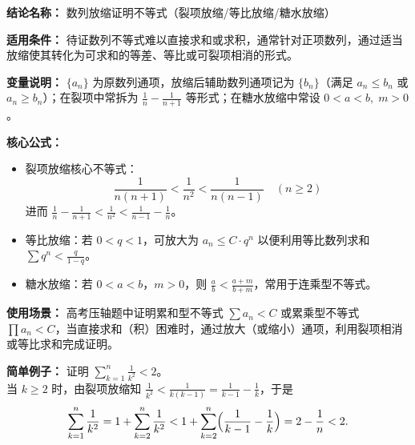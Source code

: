 \textbf{结论名称：} 数列放缩证明不等式（裂项放缩/等比放缩/糖水放缩）

\textbf{适用条件：} 待证数列不等式难以直接求和或求积，通常针对正项数列，通过适当放缩使其转化为可求和的等差、等比或可裂项相消的形式。

\textbf{变量说明：} $\{a_n\}$ 为原数列通项，放缩后辅助数列通项记为 $\{b_n\}$（满足 $a_n\le b_n$ 或 $a_n\ge b_n$）；在裂项中常拆为 $\frac{1}{n}-\frac{1}{n+1}$ 等形式；在糖水放缩中常设 $0<a<b,\;m>0$。

\textbf{核心公式：}
\begin{itemize}
  \item 裂项放缩核心不等式：
  \[
  \boxed{\frac{1}{n(n+1)} < \frac{1}{n^2} < \frac{1}{n(n-1)}\quad (n\ge 2)}
  \]
  进而 $\frac{1}{n}-\frac{1}{n+1} < \frac{1}{n^2} < \frac{1}{n-1}-\frac{1}{n}$。
  \item 等比放缩：若 $0<q<1$，可放大为 $a_n\le C\cdot q^n$ 以便利用等比数列求和 $\sum q^n < \frac{q}{1-q}$。
  \item 糖水放缩：若 $0<a<b$，$m>0$，则 $\frac{a}{b} < \frac{a+m}{b+m}$，常用于连乘型不等式。
\end{itemize}

\textbf{使用场景：} 高考压轴题中证明累和型不等式 $\sum a_n < C$ 或累乘型不等式 $\prod a_n < C$，当直接求和（积）困难时，通过放大（或缩小）通项，利用裂项相消或等比求和完成证明。

\textbf{简单例子：} 证明 $\displaystyle\sum_{k=1}^{n}\frac{1}{k^2} < 2$。\\
当 $k\ge 2$ 时，由裂项放缩知 $\frac{1}{k^2} < \frac{1}{k(k-1)} = \frac{1}{k-1} - \frac{1}{k}$，于是
\[
\sum_{k=1}^{n}\frac{1}{k^2}
= 1 + \sum_{k=2}^{n}\frac{1}{k^2}
< 1 + \sum_{k=2}^{n}\Bigl(\frac{1}{k-1} - \frac{1}{k}\Bigr)
= 2 - \frac{1}{n} < 2.
\]